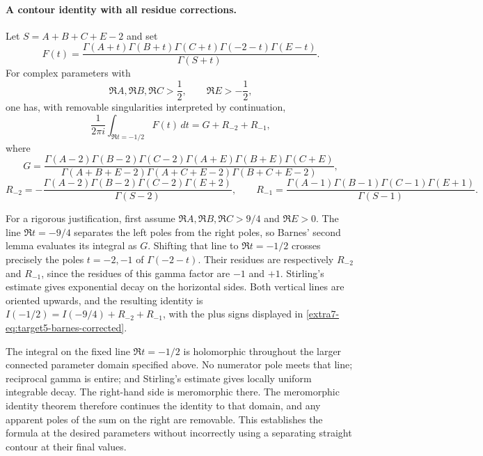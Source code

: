\documentclass[11pt,a4paper]{article}
\theoremstyle{definition}
\theoremstyle{remark}
\numberwithin{equation}{section}
\begin{document}
\paragraph{A contour identity with all residue corrections.}
Let $S=A+B+C+E-2$ and set
\[
 F(t)=\frac{\Gamma(A+t)\Gamma(B+t)\Gamma(C+t)
 \Gamma(-2-t)\Gamma(E-t)}{\Gamma(S+t)}.
\]
For complex parameters with
\[
 \Re A,\Re B,\Re C>\frac12,\qquad \Re E>-\frac12,
\]
one has, with removable singularities interpreted by continuation,
\begin{equation}
 \frac{1}{2\pi i}\int_{\Re t=-1/2}F(t)\,dt
 =G+R_{-2}+R_{-1},
 \label{extra7-eq:target5-barnes-corrected}
\end{equation}
where
\[
 G=\frac{
 \Gamma(A-2)\Gamma(B-2)\Gamma(C-2)
 \Gamma(A+E)\Gamma(B+E)\Gamma(C+E)}
 {\Gamma(A+B+E-2)\Gamma(A+C+E-2)
 \Gamma(B+C+E-2)},
\]
\[
 R_{-2}=-\frac{\Gamma(A-2)\Gamma(B-2)\Gamma(C-2)
 \Gamma(E+2)}{\Gamma(S-2)},\qquad
 R_{-1}=\frac{\Gamma(A-1)\Gamma(B-1)\Gamma(C-1)
 \Gamma(E+1)}{\Gamma(S-1)}.
\]

For a rigorous justification, first assume
$\Re A,\Re B,\Re C>9/4$ and $\Re E>0$.
The line $\Re t=-9/4$ separates the left poles from the right poles,
so Barnes' second lemma \cite{extra8-barnes} evaluates its integral as $G$.
Shifting that line to $\Re t=-1/2$ crosses precisely the poles
$t=-2,-1$ of $\Gamma(-2-t)$. Their residues are respectively
$R_{-2}$ and $R_{-1}$, since the residues of this gamma factor are
$-1$ and $+1$. Stirling's estimate gives exponential decay on the
horizontal sides. Both vertical lines are oriented upwards, and
the resulting identity is
$I(-1/2)=I(-9/4)+R_{-2}+R_{-1}$, with the plus signs displayed in
\eqref{extra7-eq:target5-barnes-corrected}.

The integral on the fixed line $\Re t=-1/2$ is holomorphic throughout
the larger connected parameter domain specified above. No numerator
pole meets that line; reciprocal gamma is entire; and Stirling's
estimate gives locally uniform integrable decay. The right-hand side
is meromorphic there. The meromorphic identity theorem therefore
continues the identity to that domain, and any apparent poles of the
sum on the right are removable. This establishes the formula at the
desired parameters without incorrectly using a separating straight
contour at their final values.
\end{document}
